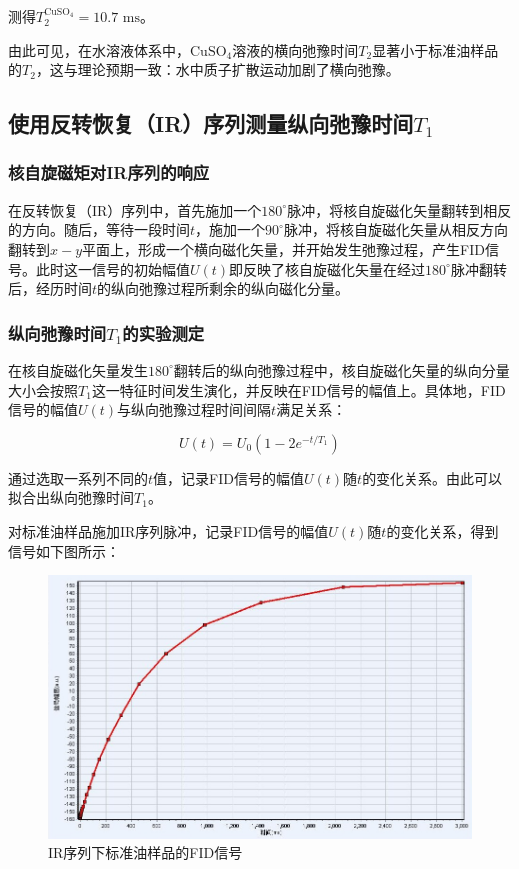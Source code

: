 \documentclass{thuemp}
\begin{document}
测得$T_2^{\text{CuSO}_4} = 10.7 \text{ ms}$。

由此可见，在水溶液体系中，$\text{CuSO}_4$溶液的横向弛豫时间$T_2$显著小于标准油样品的$T_2$，这与理论预期一致：水中质子扩散运动加剧了横向弛豫。

\subsection{使用反转恢复（IR）序列测量纵向弛豫时间$T_1$}

\subsubsection{核自旋磁矩对IR序列的响应}

在反转恢复（IR）序列中，首先施加一个$180^\circ$脉冲，将核自旋磁化矢量翻转到相反的方向。随后，等待一段时间$t$，施加一个$90^\circ$脉冲，将核自旋磁化矢量从相反方向翻转到$x-y$平面上，形成一个横向磁化矢量，并开始发生弛豫过程，产生FID信号。此时这一信号的初始幅值$U(t)$即反映了核自旋磁化矢量在经过$180^\circ$脉冲翻转后，经历时间$t$的纵向弛豫过程所剩余的纵向磁化分量。

\subsubsection{纵向弛豫时间$T_1$的实验测定} 

在核自旋磁化矢量发生$180^\circ$翻转后的纵向弛豫过程中，核自旋磁化矢量的纵向分量大小会按照$T_1$这一特征时间发生演化，并反映在FID信号的幅值上。具体地，FID信号的幅值$U(t)$与纵向弛豫过程时间间隔$t$满足关系：

\begin{equation}
U(t) = U_0 \left(1 - 2 e^{-t/T_1}\right)
\label{eq:ir_amplitude}
\end{equation}

通过选取一系列不同的$t$值，记录FID信号的幅值$U(t)$随$t$的变化关系。由此可以拟合出纵向弛豫时间$T_1$。

对标准油样品施加IR序列脉冲，记录FID信号的幅值$U(t)$随$t$的变化关系，得到信号如下图所示：

\begin{figure}[H]
    \centering
    \includegraphics[width=0.8\linewidth]{../Data/pre-experiment/Oil_T1_IR_final.JPG}
    \caption{IR序列下标准油样品的FID信号}
    \label{fig:ir_oil}
\end{figure}
\end{document}
